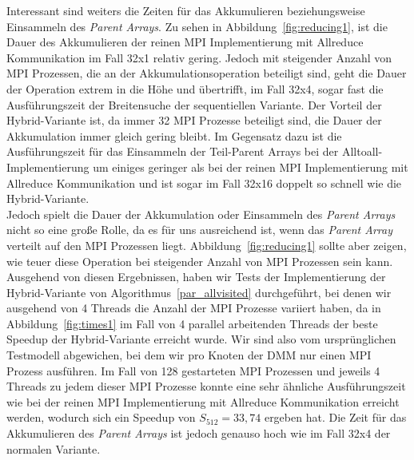 \documentclass[11pt,a4paper]{article}
\begin{document}
Interessant sind weiters die Zeiten für das Akkumulieren beziehungsweise Einsammeln des \textit{Parent Arrays}. Zu sehen in Abbildung~\ref{fig:reducing1}, ist die Dauer des Akkumulieren der reinen MPI Implementierung mit Allreduce Kommunikation im Fall 32x1 relativ gering. Jedoch mit steigender Anzahl von MPI Prozessen, die an der Akkumulationsoperation beteiligt sind, geht die Dauer der Operation extrem in die Höhe und übertrifft, im Fall 32x4, sogar fast die Ausführungszeit der Breitensuche der sequentiellen Variante. Der Vorteil der Hybrid-Variante ist, da immer 32 MPI Prozesse beteiligt sind, die Dauer der Akkumulation immer gleich gering bleibt. Im Gegensatz dazu ist die Ausführungszeit für das Einsammeln der Teil-Parent Arrays bei der Alltoall-Implementierung um einiges geringer als bei der reinen MPI Implementierung mit Allreduce Kommunikation und ist sogar im Fall 32x16 doppelt so schnell wie die Hybrid-Variante. \\
Jedoch spielt die Dauer der Akkumulation oder Einsammeln des \textit{Parent Arrays} nicht so eine große Rolle, da es für uns ausreichend ist, wenn das \textit{Parent Array} verteilt auf den MPI Prozessen liegt. Abbildung~\ref{fig:reducing1} sollte aber zeigen, wie teuer diese Operation bei steigender Anzahl von MPI Prozessen sein kann. Ausgehend von diesen Ergebnissen, haben wir Tests der Implementierung der Hybrid-Variante von Algorithmus~\ref{par_allvisited} durchgeführt, bei denen wir ausgehend von 4 Threads die Anzahl der MPI Prozesse variiert haben, da in Abbildung~\ref{fig:times1} im Fall von 4 parallel arbeitenden Threads der beste Speedup der Hybrid-Variante erreicht wurde. Wir sind also vom ursprünglichen Testmodell abgewichen, bei dem wir pro Knoten der DMM nur einen MPI Prozess ausführen. Im Fall von 128 gestarteten MPI Prozessen und jeweils 4 Threads zu jedem dieser MPI Prozesse konnte eine sehr ähnliche Ausführungszeit wie bei der reinen MPI Implementierung mit Allreduce Kommunikation erreicht werden, wodurch sich ein Speedup von \(S_{512} = 33,74\) ergeben hat. Die Zeit für das Akkumulieren des \textit{Parent Arrays} ist jedoch genauso hoch wie im Fall 32x4 der normalen Variante.\\
\end{document}
